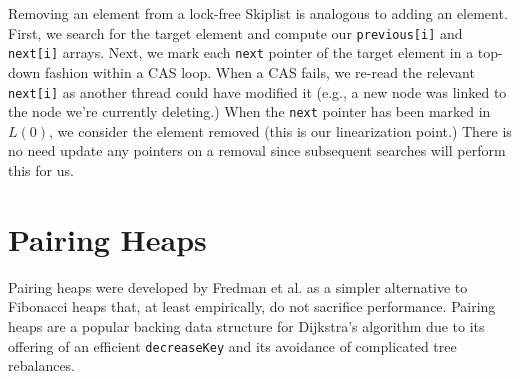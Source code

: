\documentclass{acm_proc_article-sp}
\begin{document}
Removing an element from a lock-free Skiplist is analogous to adding an element.
First, we search for the target element and compute our \texttt{previous[i]} and \texttt{next[i]}
arrays. Next, we mark each
\texttt{next} pointer of the target element in a top-down fashion within a CAS loop. When a CAS fails,
we re-read the relevant \texttt{next[i]} as another thread could have modified it (e.g., a
new node was linked to the node we're currently deleting.) When the \texttt{next}
pointer has been marked in $L(0)$, we consider the element removed (this is our linearization
point.) There is no need update any pointers on a removal since subsequent searches will perform
this for us.



\section{Pairing Heaps}
Pairing heaps were developed by Fredman et al. \cite{fredman86} as
a simpler alternative to Fibonacci heaps that, at least empirically,
do not sacrifice performance.
Pairing heaps are a popular backing data structure
for Dijkstra's algorithm due to its offering of an efficient
\texttt{decreaseKey} and its avoidance of complicated tree rebalances.
\end{document}

